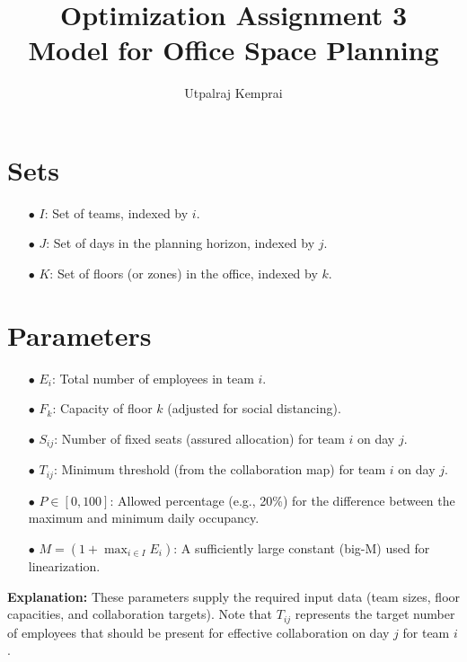 \documentclass[11pt]{article}
\begin{document}
\title{Optimization Assignment 3 \\Model for Office Space Planning}
\author{Utpalraj Kemprai}
\date{}
\maketitle

\section{Sets}
\begin{itemize}[leftmargin=2em]
    \item[$\bullet$] \textbf{$I$}: Set of teams, indexed by $i$.
    \item[$\bullet$] \textbf{$J$}: Set of days in the planning horizon, indexed by $j$.
    \item[$\bullet$] \textbf{$K$}: Set of floors (or zones) in the office, indexed by $k$.
\end{itemize}

\section{Parameters}
\begin{itemize}[leftmargin=2em]
    \item[$\bullet$] $E_i$: Total number of employees in team $i$.
    \item[$\bullet$] $F_k$: Capacity of floor $k$ (adjusted for social distancing).
    \item[$\bullet$] $S_{ij}$: Number of fixed seats (assured allocation) for team $i$ on day $j$.
    \item[$\bullet$] $T_{ij}$: Minimum threshold (from the collaboration map) for team $i$ on day $j$.
    \item[$\bullet$] $P \in [0,100]$: Allowed percentage (e.g., 20\%) for the difference between the maximum and minimum daily occupancy.
    \item[$\bullet$] \(M = \left(1 + \max_{i \in I} E_{i}\right)\): A sufficiently large constant (big-M) used for linearization.
\end{itemize}
\textbf{Explanation:} These parameters supply the required input data (team sizes, floor capacities, and collaboration targets). Note that $T_{ij}$ represents the target number of employees that should be present for effective collaboration on day $j$ for team $i$.
\end{document}
